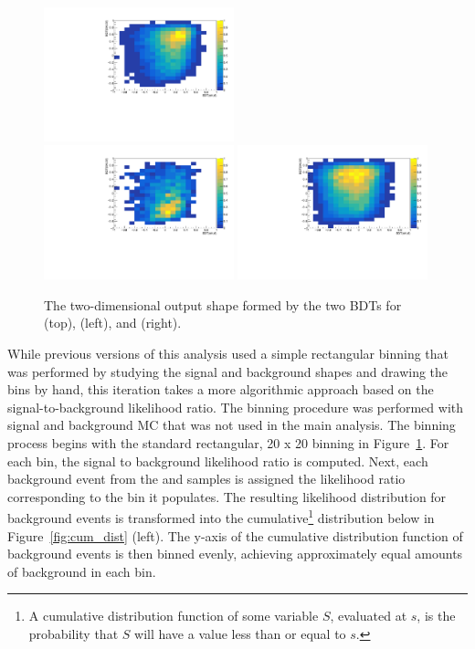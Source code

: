 \begin{figure}[htp]
\centering
\includegraphics[width=0.49\textwidth]{ch9_figs/tth_2l_2D.pdf}\\
\includegraphics[width=0.49\textwidth]{ch9_figs/tt_2l_2D.pdf}
\includegraphics[width=0.49\textwidth]{ch9_figs/ttw_2l_2D.pdf}
\caption[Two dimensional BDT output shapes of signal and backgrounds]{The two-dimensional output shape formed by the two BDTs for \tth (top), \ttbar (left), and \ttv (right).}
\label{fig:2d_shapes}
\end{figure}

While previous versions of this analysis used a simple rectangular binning that was performed by studying the signal and background shapes and drawing the bins by hand,
this iteration takes a more algorithmic approach based on the signal-to-background likelihood ratio. The binning procedure was performed with signal and background MC that was not used
in the main analysis. The binning process begins with the standard rectangular, 20 x 20 binning in Figure~\ref{fig:2d_shapes}. For each bin, the signal to background likelihood ratio is computed.
Next, each background event from the \ttbar and \ttv samples is assigned the likelihood ratio corresponding to the bin it populates. The resulting likelihood distribution for background
events is transformed into the cumulative\footnote{A cumulative distribution function of some variable $S$, evaluated at $s$, is the probability that $S$ will have a value less than or equal
to $s$.} distribution below in Figure~\ref{fig:cum_dist} (left). The y-axis of the cumulative distribution function of background events is then binned evenly, achieving approximately equal
amounts of background in each bin.

